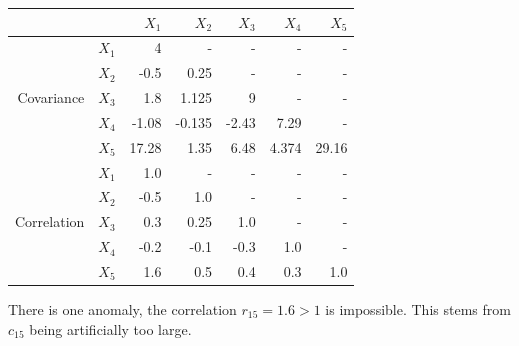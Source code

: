 \documentclass[onecolumn,10pt]{jhwhw}
\begin{document}
\begin{table}[h!]
\begin{center}
\begin{tabular}{rr|rrrrr}
\toprule
  & & $X_1$ & $X_2$ & $X_3$ & $X_4$ & $X_5$ \\
\midrule
            & $X_1$ & \cellcolor{gray} 4     & -       & -     & -     & -   \\
            & $X_2$ & -0.5   & 0.25    & -     & -     & -   \\
Covariance  & $X_3$ & 1.8    & \cellcolor{gray}1.125       & \cellcolor{gray} 9    & -     & -   \\
            & $X_4$ & -1.08  & -0.135  & -2.43 & 7.29  & -   \\
            & $X_5$ & 17.28  & \cellcolor{gray} 1.35      &  6.48 & 4.374 & \cellcolor{gray} 29.16   \\
\midrule
            & $X_1$ & 1.0      & -       & -     & -     & -   \\
            & $X_2$ & -0.5   & 1.0       & -     & -     & -   \\
Correlation & $X_3$ & \cellcolor{gray} 0.3     & 0.25    & 1.0     & -     & -   \\
            & $X_4$ & \cellcolor{gray} -0.2      & \cellcolor{gray}-0.1       & -0.3  & 1.0     & -   \\
            & $X_5$ & \cellcolor{red} 1.6     & 0.5     & \cellcolor{gray}0.4     & 0.3   & 1.0   \\
\bottomrule
\end{tabular}
\end{center}
\end{table}
There is one anomaly, the correlation $r_{15} = 1.6 > 1$ is impossible. This stems from $c_{15}$ being artificially too large.
\end{document}
